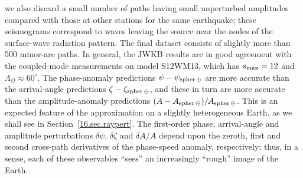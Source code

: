 we also discard a small number of paths having small
unperturbed amplitudes compared with those
at other stations for the same earthquake;
these seismograms correspond to waves leaving the
source near the nodes of the surface-wave radiation pattern.
The final dataset consists of slightly more than
500 minor-arc paths.  In general, the JWKB
results are in good agreement with the coupled-mode
measurements on model S12WM13, which has $s_{\rm max}=12$
and $\Lambda_{\Omega}\approx 60^{\circ}$.
The phase-anomaly predictions $\psi-\psi_{\rm spher\,\oplus}$ are
more accurate than the arrival-angle predictions
$\zeta-\zeta_{\rm spher\,\oplus}$, and these in turn are
more accurate than the amplitude-anomaly predictions
$(A-A_{\rm spher\,\oplus})/A_{\rm spher\,\oplus}$.  This is an expected
feature of the approximation on a slightly heterogeneous
Earth, as we shall see in Section~\ref{16.sec.raypert}.
The first-order phase, arrival-angle and amplitude
perturbations $\delta\psi$, $\delta\zeta$ and $\delta A/A$
depend upon the zeroth, first and second cross-path
derivatives of the phase-speed anomaly, respectively;
thus, in a sense, each of these observables ``sees''
an increasingly ``rough'' image of the Earth.\vspace{-0.5mm}

